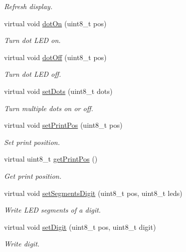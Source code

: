 \begin{DoxyCompactItemize}
\begin{DoxyCompactList}\small\item\em Refresh display. \end{DoxyCompactList}\item 
virtual void \hyperlink{class_l_k_m1638_board_adf22c1b3001db91ed263bd5952b2ea5c}{dot\+On} (uint8\+\_\+t pos)
\begin{DoxyCompactList}\small\item\em Turn dot L\+ED on. \end{DoxyCompactList}\item 
virtual void \hyperlink{class_l_k_m1638_board_ad946f70d7cabf87562fd3482e010462b}{dot\+Off} (uint8\+\_\+t pos)
\begin{DoxyCompactList}\small\item\em Turn dot L\+ED off. \end{DoxyCompactList}\item 
virtual void \hyperlink{class_l_k_m1638_board_a50f9693ca74fef320fb3898cdf4480c4}{set\+Dots} (uint8\+\_\+t dots)
\begin{DoxyCompactList}\small\item\em Turn multiple dots on or off. \end{DoxyCompactList}\item 
virtual void \hyperlink{class_l_k_m1638_board_a6d91010acd57d05179a3d6c2435993f3}{set\+Print\+Pos} (uint8\+\_\+t pos)
\begin{DoxyCompactList}\small\item\em Set print position. \end{DoxyCompactList}\item 
virtual uint8\+\_\+t \hyperlink{class_l_k_m1638_board_ad50f047120592ae1c70de9528475d0f7}{get\+Print\+Pos} ()
\begin{DoxyCompactList}\small\item\em Get print position. \end{DoxyCompactList}\item 
virtual void \hyperlink{class_l_k_m1638_board_afd4d21ac6046c65eac7198e831d959ad}{set\+Segments\+Digit} (uint8\+\_\+t pos, uint8\+\_\+t leds)
\begin{DoxyCompactList}\small\item\em Write L\+ED segments of a digit. \end{DoxyCompactList}\item 
virtual void \hyperlink{class_l_k_m1638_board_a8776f66e796c3ea9e389ea6aa50dcef2}{set\+Digit} (uint8\+\_\+t pos, uint8\+\_\+t digit)
\begin{DoxyCompactList}\small\item\em Write digit. \end{DoxyCompactList}\item 

\end{DoxyCompactItemize}
